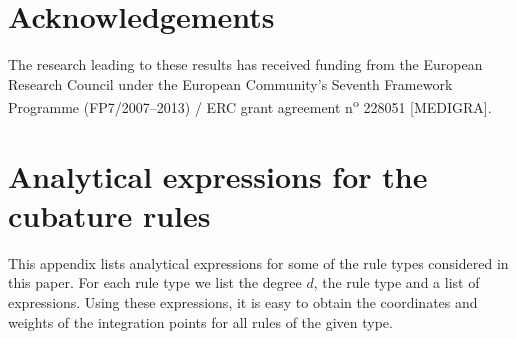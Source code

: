 \documentclass{article}
\begin{document}
\section*{Acknowledgements}

The research leading to these results has received funding from the
European Research Council under the European Community's Seventh
Framework Programme (FP7/2007--2013) / ERC grant agreement n\textsuperscript{o} 228051 [MEDIGRA].


\appendix
\section{Analytical expressions for the cubature rules}
\label{sec:app_analyt}

This appendix lists analytical expressions for some of the rule types considered in this paper. For each rule type we list the degree $d$, the rule type and a list of expressions.  Using these expressions, it is easy to obtain the coordinates and weights of the integration points for all rules of the given type.
\end{document}
